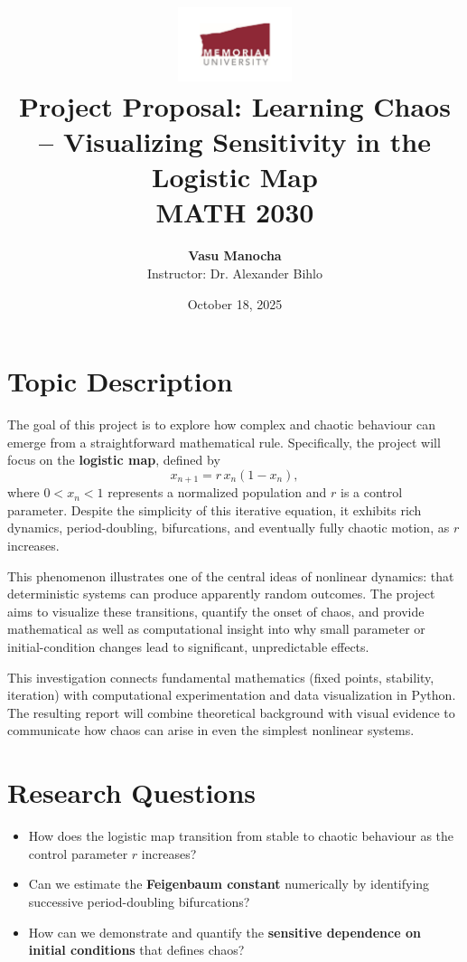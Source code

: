 \documentclass[12pt]{article}
\title{
    \includegraphics[width=0.25\textwidth]{mun_logo.pdf}\\[1em]
    \textbf{Project Proposal: Learning Chaos – Visualizing Sensitivity in the Logistic Map}\\
    \vspace{0.5em}
    \large MATH 2030 
}
\author{
    \textbf{Vasu Manocha} \\
    \vspace{0.3em}
    Instructor: Dr. Alexander Bihlo
}
\date{October 18, 2025}
\begin{document}
\maketitle
\thispagestyle{empty}
\clearpage

\setcounter{page}{1}


\section{Topic Description}
The goal of this project is to explore how complex and chaotic behaviour can emerge from a straightforward mathematical rule. Specifically, the project will focus on the \textbf{logistic map}, defined by
\[
x_{n+1} = r\,x_n(1 - x_n),
\]
where \(0 < x_n < 1\) represents a normalized population and \(r\) is a control parameter. Despite the simplicity of this iterative equation, it exhibits rich dynamics, period-doubling, bifurcations, and eventually fully chaotic motion, as \(r\) increases.

This phenomenon illustrates one of the central ideas of nonlinear dynamics: that deterministic systems can produce apparently random outcomes. The project aims to visualize these transitions, quantify the onset of chaos, and provide mathematical as well as computational insight into why small parameter or initial-condition changes lead to significant, unpredictable effects.

This investigation connects fundamental mathematics (fixed points, stability, iteration) with computational experimentation and data visualization in Python. The resulting report will combine theoretical background with visual evidence to communicate how chaos can arise in even the simplest nonlinear systems.

\section{Research Questions}
\begin{itemize}
    \item How does the logistic map transition from stable to chaotic behaviour as the control parameter \(r\) increases?
    \item Can we estimate the \textbf{Feigenbaum constant} numerically by identifying successive period-doubling bifurcations?
    \item How can we demonstrate and quantify the \textbf{sensitive dependence on initial conditions} that defines chaos?
\end{itemize}
\end{document}
